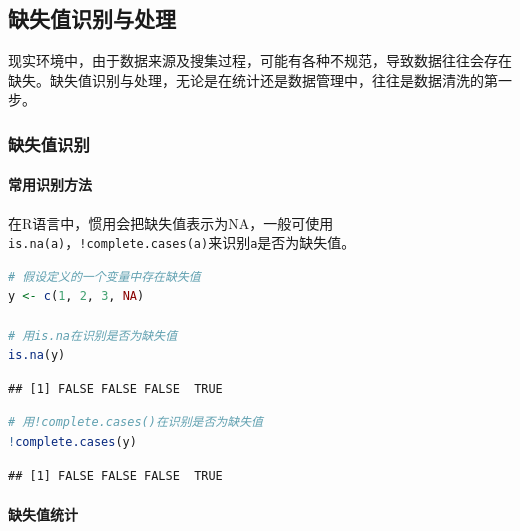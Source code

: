 \documentclass[]{ctexbook}
\let\oldparagraph\paragraph
\renewcommand{\paragraph}[1]{\oldparagraph{#1}\mbox{}}
\newcommand{\passthrough}[1]{#1}
\begin{document}
\hypertarget{ux7f3aux5931ux503cux8bc6ux522bux4e0eux5904ux7406}{%
\subsection{缺失值识别与处理}\label{ux7f3aux5931ux503cux8bc6ux522bux4e0eux5904ux7406}}

现实环境中，由于数据来源及搜集过程，可能有各种不规范，导致数据往往会存在缺失。缺失值识别与处理，无论是在统计还是数据管理中，往往是数据清洗的第一步。

\hypertarget{ux7f3aux5931ux503cux8bc6ux522b}{%
\subsubsection{缺失值识别}\label{ux7f3aux5931ux503cux8bc6ux522b}}

\hypertarget{ux5e38ux7528ux8bc6ux522bux65b9ux6cd5}{%
\paragraph{常用识别方法}\label{ux5e38ux7528ux8bc6ux522bux65b9ux6cd5}}

在R语言中，惯用会把缺失值表示为NA，一般可使用\passthrough{\lstinline!is.na(a)!}，\passthrough{\lstinline"!complete.cases(a)"}来识别\passthrough{\lstinline!a!}是否为缺失值。

\begin{lstlisting}[language=R]
# 假设定义的一个变量中存在缺失值
y <- c(1, 2, 3, NA)

# 用is.na在识别是否为缺失值
is.na(y)
\end{lstlisting}

\begin{lstlisting}
## [1] FALSE FALSE FALSE  TRUE
\end{lstlisting}

\begin{lstlisting}[language=R]
# 用!complete.cases()在识别是否为缺失值
!complete.cases(y)
\end{lstlisting}

\begin{lstlisting}
## [1] FALSE FALSE FALSE  TRUE
\end{lstlisting}

\hypertarget{ux7f3aux5931ux503cux7edfux8ba1}{%
\paragraph{缺失值统计}\label{ux7f3aux5931ux503cux7edfux8ba1}}
\end{document}
